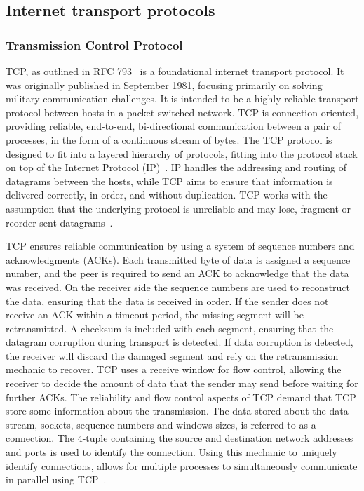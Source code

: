 \documentclass[english, 12pt, a4paper, elec, utf8, a-2b, online]{aaltothesis}
\begin{document}
\subsection{Internet transport protocols}
\subsubsection{Transmission Control Protocol}
TCP, as outlined in RFC 793~\cite{rfc793} is a foundational internet transport protocol. It was
originally published in September 1981, focusing primarily on solving military
communication challenges. It is intended to be a highly reliable transport
protocol between hosts in a packet switched network. TCP is connection-oriented,
providing reliable, end-to-end, bi-directional communication between a pair of processes, in the
form of a continuous stream of bytes. The TCP protocol is designed to fit into
a layered hierarchy of protocols, fitting into the protocol stack
on top of the Internet Protocol (IP)~\cite{rfc791}. IP handles the addressing
and routing of datagrams between the hosts, while TCP aims to ensure that
information is delivered correctly, in order, and without duplication. TCP works with
the assumption that the underlying protocol is unreliable and may lose,
fragment or reorder sent datagrams~\cite{rfc793}.

TCP ensures reliable communication by using a system of sequence numbers and
acknowledgments (ACKs). Each transmitted byte of data is assigned a sequence
number, and the peer is required to send an ACK to acknowledge that the data was
received. On the receiver side the sequence numbers are used to reconstruct the
data, ensuring that the data is received in order. If the sender does not receive
an ACK within a timeout period, the missing segment will be retransmitted. A
checksum is included with each segment, ensuring that the datagram corruption during
transport is detected. If data corruption is detected, the receiver will
discard the damaged segment and rely on the retransmission mechanic to recover.
TCP uses a receive window for flow control, allowing the receiver to decide 
the amount of data that the sender may send before waiting for further ACKs. The
reliability and flow control aspects of TCP demand that TCP store some
information about the transmission. The data stored about the data stream, sockets,
sequence numbers and windows sizes, is referred to as a connection. The 4-tuple
containing the source and destination network addresses and ports is used
to identify the connection. Using this mechanic to uniquely identify connections,
allows for multiple processes to simultaneously communicate in parallel using TCP~\cite{rfc793}.
\end{document}
